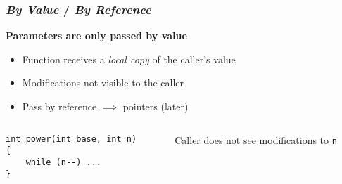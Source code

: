 \begin{frame}[fragile]
  \frametitle{\textit{By Value} / \textit{By Reference}}

  \textbf{Parameters are only passed by value}

  \begin{itemize}
  \item Function receives a \textit{local copy} of the caller's value
  \item Modifications not visible to the caller
  \item Pass by reference $\implies$ pointers (later)
  \end{itemize}

  \begin{block}{}
    \begin{columns}[c]
      \begin{column}{.5\textwidth}
        \begin{block}{}
\begin{verbatim}
int power(int base, int n)
{
    while (n--) ...
}
\end{verbatim}
        \end{block}
      \end{column}
      \begin{column}{.4\textwidth}
        Caller does not see modifications to \texttt{n}
      \end{column}
    \end{columns}
  \end{block}
  
\end{frame}
